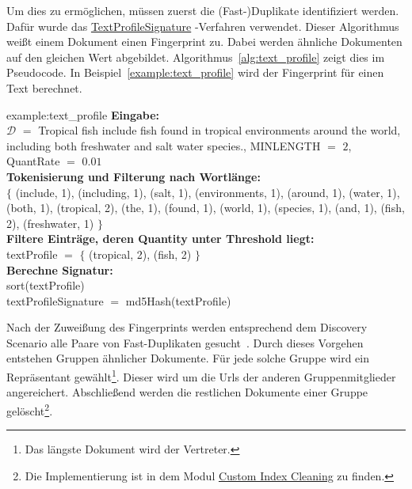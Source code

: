 Um dies zu ermöglichen, müssen zuerst die (Fast-)Duplikate identifiziert werden.
Dafür wurde das
\href{https://github.com/apache/nutch/blob/master/src/java/org/apache/nutch/crawl/TextProfileSignature.java}{TextProfileSignature}
-Verfahren verwendet.
Dieser Algorithmus weißt einem Dokument einen Fingerprint zu.
Dabei werden ähnliche Dokumenten auf den gleichen Wert abgebildet.
Algorithmus~\ref{alg:text_profile} zeigt dies im Pseudocode.
In Beispiel~\ref{example:text_profile} wird der Fingerprint für einen Text berechnet.

\begin{example}{example:text_profile}
	\textbf{Eingabe:}\\
		$\mathcal{D}$ $=$ \glqq Tropical fish include fish found in tropical environments around the world,
			including both freshwater and salt water species.\grqq,
		MINLENGTH $=$ $2$, QuantRate $=$ $0.01$\\
	
	\textbf{Tokenisierung und Filterung nach Wortlänge:}\\
		$\{$ (include, 1), (including, 1), (salt, 1), (environments, 1), (around, 1), (water, 1),
			(both, 1), (tropical, 2), (the, 1), (found, 1), (world, 1), (species, 1), (and, 1), (fish, 2), (freshwater, 1) $\}$\\

	\textbf{Filtere Einträge, deren Quantity unter Threshold liegt:}\\
		textProfile $=$ $\{$ (tropical, 2), (fish, 2) $\}$\\
	
	\textbf{Berechne Signatur:}\\
		sort(textProfile)\\
		textProfileSignature $=$ md5Hash(textProfile)
\end{example}

Nach der Zuweißung des Fingerprints werden entsprechend dem Discovery Scenario alle Paare von Fast-Duplikaten
gesucht~\cite{croft.chap3}. Durch dieses Vorgehen entstehen Gruppen ähnlicher Dokumente.
Für jede solche Gruppe wird ein Repräsentant gewählt\footnote{Das längste Dokument wird der Vertreter.}.
Dieser wird um die Urls der anderen Gruppenmitglieder angereichert.
Abschließend werden die restlichen Dokumente einer Gruppe gelöscht\footnote{Die Implementierung ist in dem Modul 
\href{https://github.com/mam10eks/search-homepage-of-university-leipzig/tree/master/custom-index-cleaning}
{Custom Index Cleaning} zu finden.}.
